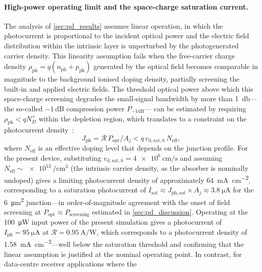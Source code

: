 \paragraph{High-power operating limit and the space-charge saturation current.}
The analysis of \cref{sec:pd_results} assumes linear operation, in which the
photocurrent is proportional to the incident optical power and the electric
field distribution within the intrinsic layer is unperturbed by the
photogenerated carrier density. This linearity assumption fails when the
free-carrier charge density $\rho_{\mathrm{ph}} = q(n_{\mathrm{ph}} +
p_{\mathrm{ph}})$ generated by the optical field becomes comparable in magnitude
to the background ionised doping density, partially screening the built-in and
applied electric fields. The threshold optical power above which this
space-charge screening degrades the small-signal bandwidth by more than
\SI{1}{\decibel}—the so-called $-1$\,dB compression power $P_{\mathrm{-1dB}}$—
can be estimated by requiring $\rho_{\mathrm{ph}} < q N_D^+$ within the
depletion region, which translates to a constraint on the photocurrent
density~\cite{Yan2024}:
\begin{equation}
    J_{\mathrm{ph}} = \mathcal{R}\,P_{\mathrm{opt}}/A_j
    < q\,v_{\mathrm{d,sat},h}\,N_{\mathrm{eff}},
    \label{eq:saturation_current_density}
\end{equation}
where $N_{\mathrm{eff}}$ is an effective doping level that depends on the
junction profile. For the present device, substituting
$v_{\mathrm{d,sat},h} = \SI{4e6}{\centi\metre\per\second}$ and assuming
$N_{\mathrm{eff}} \sim \SI{e13}{\per\centi\metre\cubed}$ (the intrinsic carrier
density, as the absorber is nominally undoped) gives a limiting photocurrent
density of approximately \SI{64}{\milli\ampere\per\centi\metre\squared},
corresponding to a saturation photocurrent of $I_{\mathrm{sat}} \approx
J_{\mathrm{ph,sat}} \times A_j \approx \SI{3.8}{\micro\ampere}$ for the
\SI{6}{\micro\metre\squared} junction—in order-of-magnitude agreement with the
onset of field screening at $P_{\mathrm{opt}} \approx P_{\mathrm{screening}}$
estimated in \cref{sec:pd_discussion}. Operating at the \SI{100}{\micro\watt}
input power of the present simulation gives a photocurrent of
$I_{\mathrm{ph}} = \SI{95}{\micro\ampere}$ at $\mathcal{R} =
\SI{0.95}{\ampere\per\watt}$, which corresponds to a photocurrent density of
\SI{1.58}{\milli\ampere\per\centi\metre\squared}—well below the saturation
threshold and confirming that the linear assumption is justified at the nominal
operating point. In contrast, for data-centre receiver applications where the
